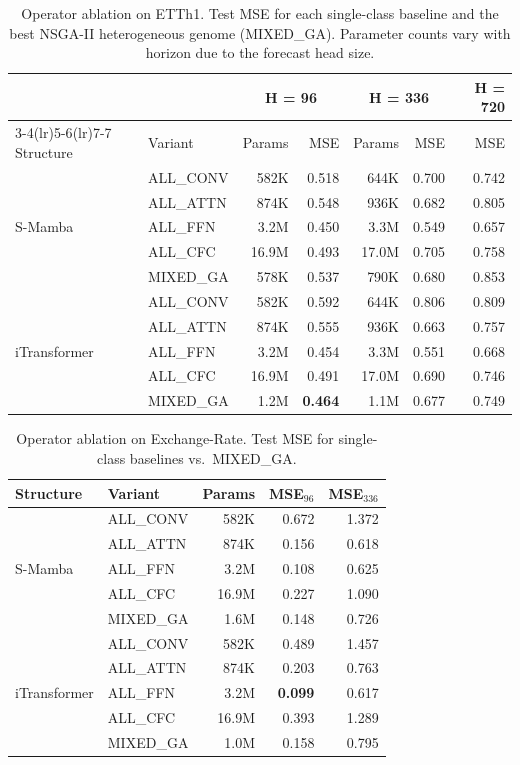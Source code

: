 \begin{table}[t]
\caption{Operator ablation on ETTh1. Test MSE for each single-class baseline and the best NSGA-II heterogeneous genome (MIXED\_GA). Parameter counts vary with horizon due to the forecast head size.}
\label{tab:exp2_etth1}
\centering
\small
\setlength{\tabcolsep}{4pt}
\begin{tabular}{llrrrrr}
\toprule
 & & \multicolumn{2}{c}{H = 96} & \multicolumn{2}{c}{H = 336} & H = 720 \\
\cmidrule(lr){3-4}\cmidrule(lr){5-6}\cmidrule(lr){7-7}
Structure & Variant & Params & MSE & Params & MSE & MSE \\
\midrule
\multirow{5}{*}{S-Mamba}
 & ALL\_CONV  & 582K  & 0.518 & 644K  & 0.700 & 0.742 \\
 & ALL\_ATTN  & 874K  & 0.548 & 936K  & 0.682 & 0.805 \\
 & ALL\_FFN   & 3.2M  & 0.450 & 3.3M  & 0.549 & 0.657 \\
 & ALL\_CFC   & 16.9M & 0.493 & 17.0M & 0.705 & 0.758 \\
 & MIXED\_GA  & 578K  & 0.537 & 790K  & 0.680 & 0.853 \\
\midrule
\multirow{5}{*}{iTransformer}
 & ALL\_CONV  & 582K  & 0.592 & 644K  & 0.806 & 0.809 \\
 & ALL\_ATTN  & 874K  & 0.555 & 936K  & 0.663 & 0.757 \\
 & ALL\_FFN   & 3.2M  & 0.454 & 3.3M  & 0.551 & 0.668 \\
 & ALL\_CFC   & 16.9M & 0.491 & 17.0M & 0.690 & 0.746 \\
 & MIXED\_GA  & 1.2M  & \textbf{0.464} & 1.1M & 0.677 & 0.749 \\
\bottomrule
\end{tabular}
\end{table}

\begin{table}[t]
\caption{Operator ablation on Exchange-Rate. Test MSE for single-class baselines vs.\ MIXED\_GA.}
\label{tab:exp2_exchange}
\centering
\small
\setlength{\tabcolsep}{4pt}
\begin{tabular}{llrrr}
\toprule
Structure & Variant & Params & MSE$_{96}$ & MSE$_{336}$ \\
\midrule
\multirow{5}{*}{S-Mamba}
 & ALL\_CONV  & 582K  & 0.672 & 1.372 \\
 & ALL\_ATTN  & 874K  & 0.156 & 0.618 \\
 & ALL\_FFN   & 3.2M  & 0.108 & 0.625 \\
 & ALL\_CFC   & 16.9M & 0.227 & 1.090 \\
 & MIXED\_GA  & 1.6M  & 0.148 & 0.726 \\
\midrule
\multirow{5}{*}{iTransformer}
 & ALL\_CONV  & 582K  & 0.489 & 1.457 \\
 & ALL\_ATTN  & 874K  & 0.203 & 0.763 \\
 & ALL\_FFN   & 3.2M  & \textbf{0.099} & 0.617 \\
 & ALL\_CFC   & 16.9M & 0.393 & 1.289 \\
 & MIXED\_GA  & 1.0M  & 0.158 & 0.795 \\
\bottomrule
\end{tabular}
\end{table}

